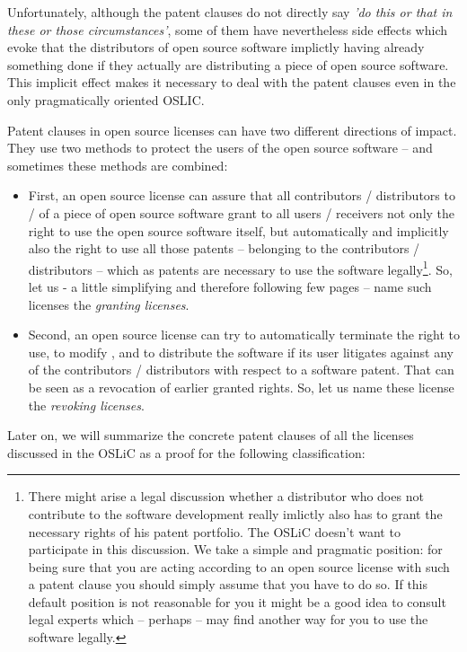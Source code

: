 Unfortunately, although the patent clauses do not directly say \emph{'do this or
that in these or those circumstances'}, some of them have nevertheless side
effects which evoke that the distributors of open source software implictly
having already something done if they actually are distributing a piece of open
source software. This implicit effect makes it necessary to deal with the patent
clauses even in the only pragmatically oriented OSLIC.

Patent clauses in open source licenses can have two different directions of
impact. They use two methods to protect the users of the open source software --
and sometimes these methods are combined:

\begin{itemize}
  \item First, an open source license can assure that all contributors /
  distributors to / of a piece of open source software grant to all users /
  receivers not only the right to use the open source software itself, but
  automatically and implicitly also the right to use all those patents --
  belonging to the contributors / distributors -- which as patents are necessary
  to use the software legally\footnote{There might arise a legal discussion
  whether a distributor who does not contribute to the software development
  really imlictly also has to grant the necessary rights of his patent
  portfolio. The OSLiC doesn't want to participate in this discussion. We take a
  simple and pragmatic position: for being sure that you are acting according to
  an open source license with such a patent clause you should simply assume
  that you have to do so. If this default position is not reasonable for you it
  might be a good idea to consult legal experts which -- perhaps -- may find
  another way for you to use the software legally.}. So, let us - a little
  simplifying and therefore following few pages -- name such licenses the
  \emph{granting licenses}.
  \item Second, an open source license can try to automatically terminate the
  right to use, to modify , and to distribute the software if its user litigates
  against any of the contributors / distributors with respect to a software
  patent. That can be seen as a revocation of earlier granted rights. So, let us
  name these license the \emph{revoking licenses}.
\end{itemize}

Later on, we will summarize the concrete patent clauses of all the licenses
discussed in the OSLiC as a proof for the following classification:


